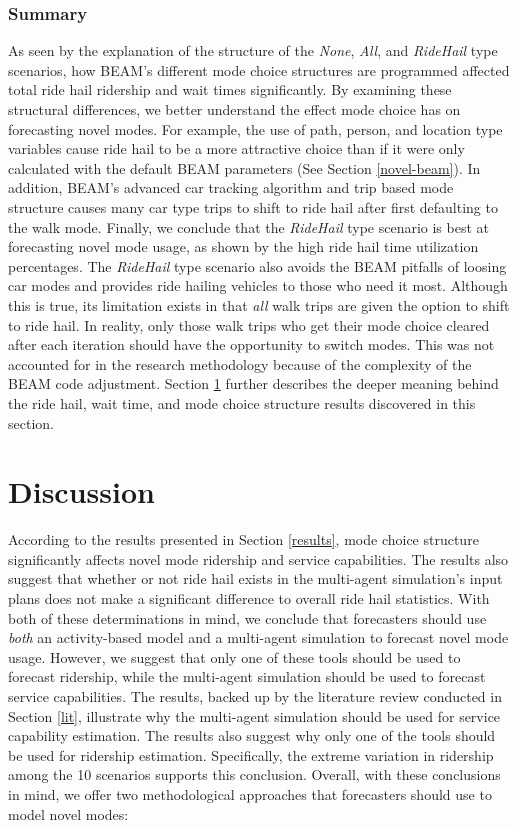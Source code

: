 \documentclass[fancy, masters]{byuthesis}
\begin{document}
\hypertarget{summary-2}{%
\subsection{Summary}\label{summary-2}}

As seen by the explanation of the structure of the \emph{None}, \emph{All}, and \emph{RideHail} type scenarios, how BEAM's different mode choice structures are programmed affected total ride hail ridership and wait times significantly. By examining these structural differences, we better understand the effect mode choice has on forecasting novel modes. For example, the use of path, person, and location type variables cause ride hail to be a more attractive choice than if it were only calculated with the default BEAM parameters (See Section \ref{novel-beam}). In addition, BEAM's advanced car tracking algorithm and trip based mode structure causes many car type trips to shift to ride hail after first defaulting to the walk mode. Finally, we conclude that the \emph{RideHail} type scenario is best at forecasting novel mode usage, as shown by the high ride hail time utilization percentages. The \emph{RideHail} type scenario also avoids the BEAM pitfalls of loosing car modes and provides ride hailing vehicles to those who need it most. Although this is true, its limitation exists in that \emph{all} walk trips are given the option to shift to ride hail. In reality, only those walk trips who get their mode choice cleared after each iteration should have the opportunity to switch modes. This was not accounted for in the research methodology because of the complexity of the BEAM code adjustment. Section \ref{discussion} further describes the deeper meaning behind the ride hail, wait time, and mode choice structure results discovered in this section.

\hypertarget{discussion}{%
\chapter{Discussion}\label{discussion}}

According to the results presented in Section \ref{results}, mode choice structure significantly affects novel mode ridership and service capabilities. The results also suggest that whether or not ride hail exists in the multi-agent simulation's input plans does not make a significant difference to overall ride hail statistics. With both of these determinations in mind, we conclude that forecasters should use \emph{both} an activity-based model and a multi-agent simulation to forecast novel mode usage. However, we suggest that only one of these tools should be used to forecast ridership, while the multi-agent simulation should be used to forecast service capabilities. The results, backed up by the literature review conducted in Section \ref{lit}, illustrate why the multi-agent simulation should be used for service capability estimation. The results also suggest why only one of the tools should be used for ridership estimation. Specifically, the extreme variation in ridership among the 10 scenarios supports this conclusion. Overall, with these conclusions in mind, we offer two methodological approaches that forecasters should use to model novel modes:
\end{document}
